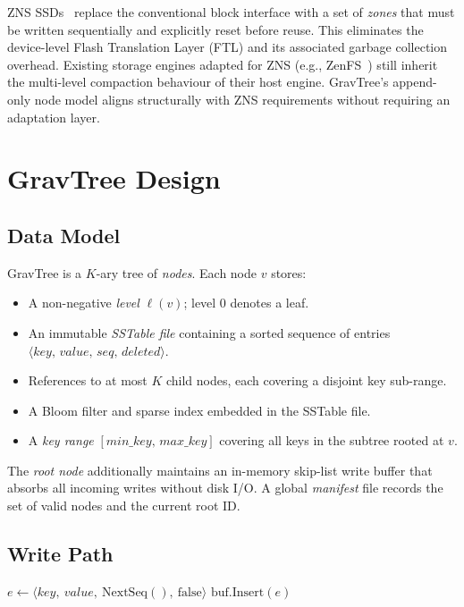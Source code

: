 \documentclass[10pt,twocolumn]{article}
\begin{document}
ZNS SSDs~\cite{zns} replace the conventional block interface with a set of
\emph{zones} that must be written sequentially and explicitly reset before
reuse.  This eliminates the device-level Flash Translation Layer (FTL) and
its associated garbage collection overhead.  Existing storage engines adapted
for ZNS (e.g., ZenFS~\cite{zenfs}) still inherit the multi-level compaction
behaviour of their host engine.  GravTree's append-only node model aligns
structurally with ZNS requirements without requiring an adaptation layer.

\section{GravTree Design}
\label{sec:design}

\subsection{Data Model}

GravTree is a $K$-ary tree of \emph{nodes}.  Each node $v$ stores:
\begin{itemize}
  \item A non-negative \emph{level} $\ell(v)$; level 0 denotes a leaf.
  \item An immutable \emph{SSTable file} containing a sorted sequence of
        entries $\langle \mathit{key},\, \mathit{value},\, \mathit{seq},\,
        \mathit{deleted} \rangle$.
  \item References to at most $K$ child nodes, each covering a disjoint
        key sub-range.
  \item A Bloom filter and sparse index embedded in the SSTable file.
  \item A \emph{key range} $[\mathit{min\_key},\, \mathit{max\_key}]$
        covering all keys in the subtree rooted at $v$.
\end{itemize}

The \emph{root node} additionally maintains an in-memory skip-list write
buffer that absorbs all incoming writes without disk I/O.  A global
\emph{manifest} file records the set of valid nodes and the current root ID.

\subsection{Write Path}

\begin{algorithm}[t]
\caption{Insert($key$, $value$)}
\label{alg:insert}
\begin{algorithmic}[1]
  \State {} 
\EndIf
\State $e \gets \langle key,\ value,\ \mathrm{NextSeq}(),\ \mathrm{false} \rangle$
\State $\mathrm{buf.Insert}(e)$ 
  \State {}
\EndIf
\end{algorithmic}
\end{algorithm}
\end{document}
